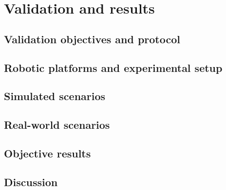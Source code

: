 \chapter{Validation and results}
\section{Validation objectives and protocol}
\section{Robotic platforms and experimental setup}
\section{Simulated scenarios}
\section{Real-world scenarios}
\section{Objective results}
\section{Discussion}
